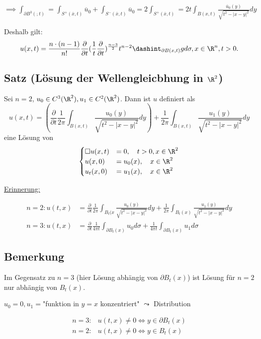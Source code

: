 $\implies \int_{\partial B^3(\overline, t)} = \int_{S^+ (\overline x, t)} \overline u_0 + \int_{S^- (\overline x, t)} \overline u_0 = 2 \int_{S^+(\overline x, t)} = 2t \int_{B(x,t)} \frac{\overline u_0(y)}{\sqrt{t^2 - |x - y|^2}} dy$

Deshalb gilt:
$$
u(x,t) = \frac{n \cdot (n - 1)}{n!} \frac{\partial }{\partial t} (\frac{1}{t} \frac{\partial }{\partial t})^{\frac{n - 3}{2}} t^{n - 2} \dashint_{\partial B(x,t)} g d\sigma, x \in \R^n, t > 0.
$$

\subsection{Satz (Lösung der Wellengleicbhung in $\R^2$)}

Sei $n = 2$, $u_0 \in C^3(\R^2), u_1 \in C^2(\R^2)$.
Dann ist $u$ definiert als
$$
u(x,t) 
= \left(\frac{\partial}{\partial t} \frac{1}{2\pi} \int_{B(x,t)} \frac{u_0(y)}{\sqrt{t^2 
- |x - y|^2}} dy\right) + \frac{1}{2\pi} \int_{B(x,t)} \frac{u_1(y)}{\sqrt{t^2 - |x - y|^2} } dy
$$
eine Lösung von
$$
\begin{cases}
\square u(x, t) &= 0, \quad t > 0, x \in \R^2 \\
u(x,0) &= u_0(x), \quad x \in \R^2 \\
u_t(x, 0) &= u_1(x), \quad x \in \R^2
\end{cases}
$$

\underline{Erinnerung:}

\begin{align*}
n = 2 \colon  u(t, x) &= \frac{\partial }{\partial t} \frac{1}{2\pi} \int_{B_t(x} \frac{u_0(y)}{\sqrt{t^2 - |x - y|^2}} dy + \frac{1}{2\pi} \int_{B_t(x)} \frac{u_1(y)}{\sqrt{t^2 - |x - y|^2}} dy \\
n = 3 \colon u(t,x) &= \frac{\partial}{\partial t} \frac{1}{4\pi t}\int_{\partial B_t(x)} u_0 d\sigma + \frac{1}{4\pi t} \int_{\partial B_t(x)} u_1 d\sigma
\end{align*}

\subsection{Bemerkung}

Im Gegensatz zu $n = 3$ (hier Lösung abhängig von $\partial B_t(x)$) ist Lösung für $n = 2$ nur abhängig von $B_t(x)$.

$u_0 = 0, u_1 = $"funktion in $y = x$ konzentriert" $\leadsto$ Distribution

\begin{align*}
n = 3 \colon &u(t,x) \neq 0 \iff y \in \partial B_t(x) \\
n = 2 \colon &u(t,x) \neq 0 \iff y \in B_t(x)
\end{align*}

